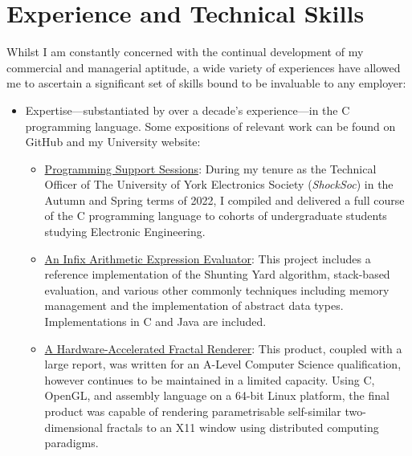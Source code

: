 \documentclass{article}
\newcommand{\githublink}[2]{\href{https://github.com/oliverdixon/#1}{#2}}
\newcommand{\weblink}[2]{\href{https://www-users.york.ac.uk/~od641/#1}{#2}}
\begin{document}
\section{Experience and Technical Skills}
Whilst I am constantly concerned with the continual development of my commercial
and managerial aptitude, a wide variety of experiences have allowed me to
ascertain a significant set of skills bound to be invaluable to any employer:
\begin{itemize}
        \item Expertise---substantiated by over a decade's experience---in the C
        programming language. Some expositions of relevant work can be found on
        GitHub and my University website:
        \begin{itemize}
                \item \weblink{pss}{Programming Support Sessions}: During my
                tenure as the Technical Officer of The University of York
                Electronics Society (\textit{ShockSoc}) in the Autumn and Spring
                terms of 2022, I compiled and delivered a full course of the C
                programming language to cohorts of undergraduate students
                studying Electronic Engineering.

                \item \githublink{calculator-demo}{An Infix Arithmetic
                Expression Evaluator}: This project includes a reference
                implementation of the Shunting Yard algorithm, stack-based
                evaluation, and various other commonly techniques including
                memory management and the implementation of abstract data types.
                Implementations in C and Java are included.

                \item \weblink{fractal}{A Hardware-Accelerated Fractal
                Renderer}: This product, coupled with a large report, was
                written for an A-Level Computer Science qualification, however
                continues to be maintained in a limited capacity. Using C,
                OpenGL, and assembly language on a 64-bit Linux platform, the
                final product was capable of rendering parametrisable
                self-similar two-dimensional fractals to an X11 window using
                distributed computing paradigms.


\end{itemize}
\end{itemize}
\end{document}
